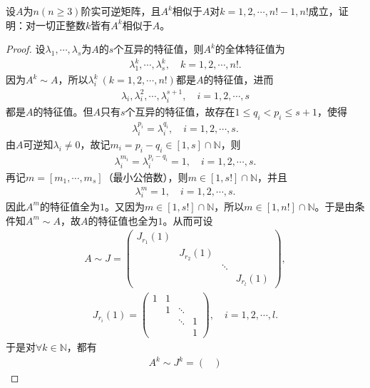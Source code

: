 \documentclass[../../main.tex]{subfiles}
\begin{document}
\begin{example}
设$A$为$n(n \geq 3)$阶实可逆矩阵，且$A^k$相似于$A$对$k = 1,2,\cdots,n!-1,n!$成立，证明：对一切正整数$k$皆有$A^k$相似于$A$。
\end{example}
\begin{proof}
设$\lambda_1,\cdots,\lambda_s$为$A$的$s$个互异的特征值，则$A^k$的全体特征值为
\begin{align*}
\lambda_1^k,\cdots,\lambda_s^k,\quad k=1,2,\cdots,n!.
\end{align*}
因为$A^k\sim A$，所以$\lambda_i^k\ (k=1,2,\cdots,n!)$都是$A$的特征值，进而
\begin{align*}
\lambda_i,\lambda_i^2,\cdots,\lambda_i^{s+1},\quad i=1,2,\cdots,s
\end{align*}
都是$A$的特征值。但$A$只有$s$个互异的特征值，故存在$1\leqslant q_i<p_i\leqslant s+1$，使得
\begin{align*}
\lambda_i^{p_i}=\lambda_i^{q_i},\quad i=1,2,\cdots,s.
\end{align*}
由$A$可逆知$\lambda_i\ne 0$，故记$m_i=p_i-q_i\in [1,s]\cap\mathbb{N}$，则
\begin{align*}
\lambda_i^{m_i}=\lambda_i^{p_i-q_i}=1,\quad i=1,2,\cdots,s.
\end{align*}
再记$m=[m_1,\cdots,m_s]$（最小公倍数），则$m\in [1,s!]\cap\mathbb{N}$，并且
\begin{align*}
\lambda_i^m=1,\quad i=1,2,\cdots,s.
\end{align*}
因此$A^m$的特征值全为$1$。又因为$m\in [1,s!]\cap\mathbb{N}$，所以$m\in [1,n!]\cap\mathbb{N}$。于是由条件知$A^m\sim A$，故$A$的特征值也全为$1$。从而可设
\begin{align*}
A\sim J=\begin{pmatrix}
J_{r_1}(1) & & & \\
& J_{r_2}(1) & & \\
& & \ddots & \\
& & & J_{r_l}(1)
\end{pmatrix},
\end{align*}
\begin{align*}
J_{r_i}(1)=\begin{pmatrix}
1 & 1 & & \\
& 1 & \ddots & \\
& & \ddots & 1 \\
& & & 1
\end{pmatrix},\quad i=1,2,\cdots,l.
\end{align*}
于是对$\forall k\in\mathbb{N}$，都有
\begin{align*}
A^k\sim J^k=\begin{pmatrix}

\end{pmatrix}
\end{align*}
\end{proof}
\end{document}
